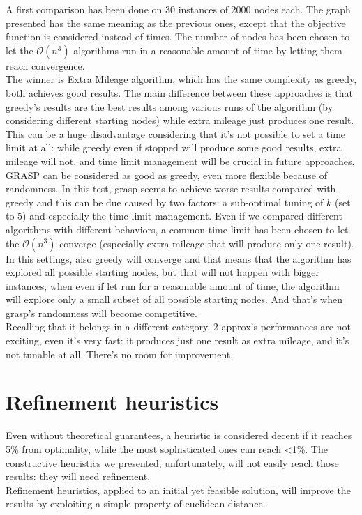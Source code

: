 A first comparison has been done on 30 instances of 2000 nodes each. The graph
presented has the same meaning as the previous ones, except that
the objective function is considered instead of times. The number of nodes has
been chosen to let the $\mathcal{O}(n^3)$ algorithms run in a reasonable amount
of time by letting them reach convergence. \\
The winner is Extra Mileage algorithm, which has the same
complexity as greedy, both achieves good results. The main difference between
these approaches is that greedy's results are the best results among various
runs of the algorithm (by considering different starting nodes) while extra
mileage just produces one result. This can be a huge disadvantage considering
that it's not possible to set a time limit at all: while greedy even if stopped
will produce some good results, extra mileage will not, and time limit
management will be crucial in future approaches. \\
GRASP can be considered as good as greedy, even more flexible because of
randomness. In this test, grasp seems to achieve worse results compared with
greedy and this can be due caused by two factors: a sub-optimal tuning of $k$
(set to $5$) and especially the time limit management. Even if we compared
different algorithms with different behaviors, a common time limit has been
chosen to let the $\mathcal{O}(n^3)$ converge (especially extra-mileage
that will produce only one result). In this settings, also greedy will converge
and that means that the algorithm has explored all possible starting nodes, but
that will not happen with bigger instances, when even if let run for a
reasonable amount of time, the algorithm will explore only a small subset of all
possible starting nodes. And that's when grasp's randomness will become
competitive.\\ 
Recalling that it belongs in a different category, 2-approx's performances are not
exciting, even it's very fast: it produces just one result as extra mileage, and
it's not tunable at all. There's no room for improvement.

\section{Refinement heuristics}

Even without theoretical guarantees, a heuristic is considered decent if it
reaches 5\% from optimality, while the most sophisticated ones  can reach <1\%.
The constructive heuristics we presented, unfortunately, will not easily reach
those results: they will need refinement. \\
Refinement heuristics, applied to an initial yet feasible solution, will improve
the results by exploiting a simple property of euclidean distance.

